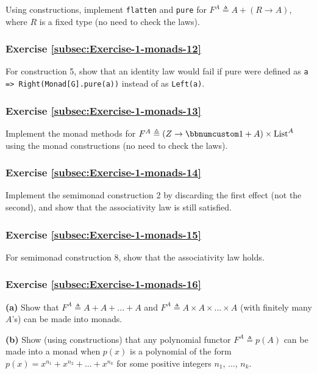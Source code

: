 Using constructions, implement \lstinline!flatten! and \lstinline!pure!
for $F^{A}\triangleq A+\left(R\rightarrow A\right)$, where $R$ is
a fixed type (no need to check the laws).

\subsubsection{Exercise \label{subsec:Exercise-1-monads-12}\ref{subsec:Exercise-1-monads-12}}

For construction 5, show that an identity law would fail if pure were
defined as \lstinline!a => Right(Monad[G].pure(a))! instead of as
\lstinline!Left(a)!.

\subsubsection{Exercise \label{subsec:Exercise-1-monads-13}\ref{subsec:Exercise-1-monads-13}}

Implement the monad methods for $F^{A}\triangleq\left(Z\rightarrow\bbnum 1+A\right)\times\text{List}^{A}$
using the monad constructions (no need to check the laws).

\subsubsection{Exercise \label{subsec:Exercise-1-monads-14}\ref{subsec:Exercise-1-monads-14}}

Implement the semimonad construction 2 by discarding the first effect
(not the second), and show that the associativity law is still satisfied.

\subsubsection{Exercise \label{subsec:Exercise-1-monads-15}\ref{subsec:Exercise-1-monads-15}}

For semimonad construction 8, show that the associativity law holds.

\subsubsection{Exercise \label{subsec:Exercise-1-monads-16}\ref{subsec:Exercise-1-monads-16}}

\textbf{(a)} Show that $F^{A}\triangleq A+A+...+A$ and $F^{A}\triangleq A\times A\times...\times A$
(with finitely many $A$\textsf{'}s) can be made into monads.

\textbf{(b)} Show (using constructions) that any polynomial functor
$F^{A}\triangleq p(A)$ can be made into a monad when $p(x)$ is a
polynomial of the form $p(x)=x^{n_{1}}+x^{n_{2}}+...+x^{n_{k}}$ for
some positive integers $n_{1}$, ..., $n_{k}$. 

